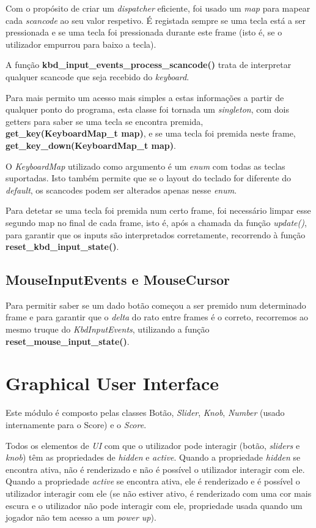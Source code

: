 \documentclass{report}
\begin{document}
Com o propósito de criar um \textit{dispatcher} eficiente, foi usado um \textit{map} para mapear cada \textit{scancode} ao seu valor respetivo. É registada sempre se uma tecla está a ser pressionada e se uma tecla foi pressionada durante este frame (isto é, se o utilizador empurrou para baixo a tecla).

A função \textbf{kbd\_input\_events\_process\_scancode()} trata de interpretar qualquer scancode que seja recebido do \textit{keyboard}.

Para mais permito um acesso mais simples a estas informações a partir de qualquer ponto do programa, esta classe foi tornada um \textit{singleton}, com dois getters para saber se uma tecla se encontra premida, \textbf{get\_key(KeyboardMap\_t map)}, e se uma tecla foi premida neste frame, \textbf{get\_key\_down(KeyboardMap\_t map)}.

O \textit{KeyboardMap} utilizado como argumento é um \textit{enum} com todas as teclas suportadas. Isto também permite que se o layout do teclado for diferente do \textit{default}, os scancodes podem ser alterados apenas nesse \textit{enum}.

Para detetar se uma tecla foi premida num certo frame, foi necessário limpar esse segundo map no final de cada frame, isto é, após a chamada da função \textit{update()}, para garantir que os inputs são interpretados corretamente, recorrendo à função \textbf{reset\_kbd\_input\_state()}.\newline

\subsection{MouseInputEvents e MouseCursor}

Para permitir saber se um dado botão começou a ser premido num determinado frame e para garantir que o \textit{delta} do rato entre frames é o correto, recorremos ao mesmo truque do \textit{KbdInputEvents}, utilizando a função \textbf{reset\_mouse\_input\_state()}.

\section{Graphical User Interface}

Este módulo é composto pelas classes Botão, \textit{Slider}, \textit{Knob}, \textit{Number} (usado internamente para o Score) e o \textit{Score}.

Todos os elementos de \textit{UI} com que o utilizador pode interagir (botão, \textit{sliders} e \textit{knob}) têm as propriedades de \textit{hidden} e \textit{active}. Quando a propriedade \textit{hidden} se encontra ativa, não é renderizado e não é possível o utilizador interagir com ele. Quando a propriedade \textit{active} se encontra ativa, ele é renderizado e é possível o utilizador interagir com ele (se não estiver ativo, é renderizado com uma cor mais escura e o utilizador não pode interagir com ele, propriedade usada quando um jogador não tem acesso a um \textit{power up}).
\end{document}
